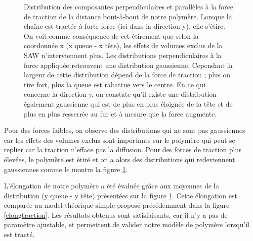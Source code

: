 \begin{figure}[H]
\begin{center}
\caption[Résultats numériques: distributions pendant la traction]{Distribution des composantes perpendiculaires et parallèles à la force de traction de la distance bout-à-bout de notre polymère. Lorsque la chaîne est tractée à forte force (ici dans la direction y), elle s'étire. On voit comme conséquence de cet étirement que selon la coordonnée x (x queue - x tête),  les effets de volumes exclus de la SAW n'interviennent plus. Les distributions perpendiculaires à la force appliquée retrouvent une distribution gaussienne. Cependant la largeur de cette distribution dépend de la force de traction ; plus on tire fort, plus la queue est rabattue vers le centre. En ce qui concerne la direction y, on constate qu'il existe une distribution également gaussienne qui est de plus en plus éloignée de la tête et de plus en plus resserrée au fur et à mesure que la force augmente. }
\label{traction}
\end{center}
\end{figure}

Pour des forces faibles, on observe des distributions qui ne sont pas gaussiennes car les effets des volumes exclus sont importants sur le polymère qui peut se replier car la traction n'efface pas la diffusion. Pour des forces de traction plus élevées, le polymère est étiré et on a alors des distributions qui redeviennent gaussiennes comme le montre la figure \ref{traction}.


L'élongation de notre polymère a été évaluée grâce aux moyennes de la distribution (y queue - y tête) présentées sur la figure \ref{traction}. Cette élongation est comparée au model théorique simple proposé précédemment dans la figure \ref{elongtraction}. Les résultats obtenus sont satisfaisants, car il n'y a pas de paramètre ajustable, et permettent de valider notre modèle de polymère lorsqu'il est tracté.


